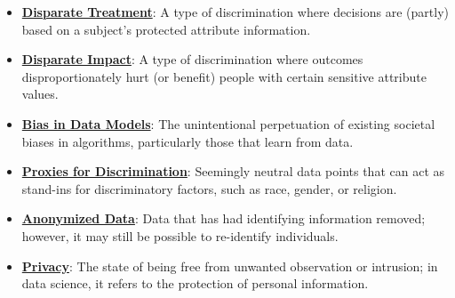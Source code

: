 \documentclass{article}%
\begin{document}
\begin{itemize}[leftmargin=*]%
\item \href{https://purdue.brightspace.com/d2l/common/assets/pdfjs-d2l-dist/1.0.14-legacy/web/viewer.html?file=%2Fcontent%2Fenforced%2F1095467-wl.202510.CS.24300.001%2F16L2-ethics.pdf%3Fou%3D1095467&lang=en-us&container=d2l-fileviewer-rendered-pdf&fullscreen=d2l-fileviewer-rendered-pdf-dialog&height=667#page=19}{\textbf{Disparate Treatment}}: A type of discrimination where decisions are (partly) based on a subject's protected attribute information.%
\item \href{https://purdue.brightspace.com/d2l/common/assets/pdfjs-d2l-dist/1.0.14-legacy/web/viewer.html?file=%2Fcontent%2Fenforced%2F1095467-wl.202510.CS.24300.001%2F16L2-ethics.pdf%3Fou%3D1095467&lang=en-us&container=d2l-fileviewer-rendered-pdf&fullscreen=d2l-fileviewer-rendered-pdf-dialog&height=667#page=19}{\textbf{Disparate Impact}}: A type of discrimination where outcomes disproportionately hurt (or benefit) people with certain sensitive attribute values.%
\item \href{https://purdue.brightspace.com/d2l/common/assets/pdfjs-d2l-dist/1.0.14-legacy/web/viewer.html?file=%2Fcontent%2Fenforced%2F1095467-wl.202510.CS.24300.001%2F16L2-ethics.pdf%3Fou%3D1095467&lang=en-us&container=d2l-fileviewer-rendered-pdf&fullscreen=d2l-fileviewer-rendered-pdf-dialog&height=667#page=12}{\textbf{Bias in Data Models}}: The unintentional perpetuation of existing societal biases in algorithms, particularly those that learn from data.%
\item \href{https://purdue.brightspace.com/d2l/common/assets/pdfjs-d2l-dist/1.0.14-legacy/web/viewer.html?file=%2Fcontent%2Fenforced%2F1095467-wl.202510.CS.24300.001%2F16L2-ethics.pdf%3Fou%3D1095467&lang=en-us&container=d2l-fileviewer-rendered-pdf&fullscreen=d2l-fileviewer-rendered-pdf-dialog&height=667#page=13}{\textbf{Proxies for Discrimination}}: Seemingly neutral data points that can act as stand-ins for discriminatory factors, such as race, gender, or religion.%
\item \href{https://purdue.brightspace.com/d2l/common/assets/pdfjs-d2l-dist/1.0.14-legacy/web/viewer.html?file=%2Fcontent%2Fenforced%2F1095467-wl.202510.CS.24300.001%2F16L2-ethics.pdf%3Fou%3D1095467&lang=en-us&container=d2l-fileviewer-rendered-pdf&fullscreen=d2l-fileviewer-rendered-pdf-dialog&height=667#page=10}{\textbf{Anonymized Data}}: Data that has had identifying information removed; however, it may still be possible to re-identify individuals.%
\item \href{https://purdue.brightspace.com/d2l/common/assets/pdfjs-d2l-dist/1.0.14-legacy/web/viewer.html?file=%2Fcontent%2Fenforced%2F1095467-wl.202510.CS.24300.001%2F16L2-ethics.pdf%3Fou%3D1095467&lang=en-us&container=d2l-fileviewer-rendered-pdf&fullscreen=d2l-fileviewer-rendered-pdf-dialog&height=667#page=11}{\textbf{Privacy}}: The state of being free from unwanted observation or intrusion; in data science, it refers to the protection of personal information.%

\end{itemize}
\end{document}
